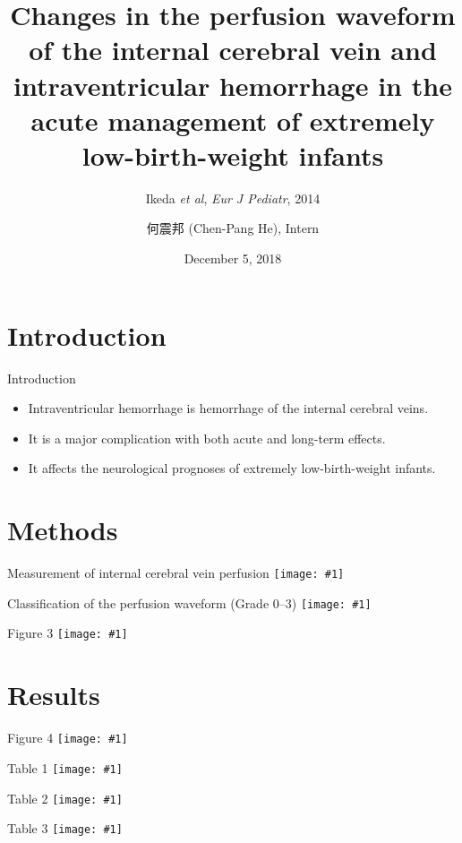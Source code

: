 \documentclass{beamer}
\title[(Ikeda \textit{et al}, 2018)]{
    Changes in the perfusion waveform of the internal cerebral vein and
    intraventricular hemorrhage in the acute management of extremely
    low-birth-weight infants
}
\subtitle{Ikeda \textit{et al}, \textit{Eur J Pediatr}, 2014}
\author[Chen-Pang He]{何震邦 (Chen-Pang He), Intern}
\date{December 5, 2018}
\institute[CGH]{Cathay General Hospital}
\newcommand*{\solo}[1]{\centering\texttt{[image: \#1]}}
\begin{document}
\maketitle

\section{Introduction}
\begin{frame}{Introduction}
    \begin{itemize}
        \item Intraventricular hemorrhage is hemorrhage of the internal cerebral veins.
        \item It is a major complication with both acute and long-term effects.
        \item It affects the neurological prognoses of extremely low-birth-weight infants.
    \end{itemize}
\end{frame}

\section{Methods}
\begin{frame}{Measurement of internal cerebral vein perfusion}
    \solo{F1.png}
\end{frame}

\begin{frame}{Classification of the perfusion waveform (Grade 0--3)}
    \solo{F2.png}
\end{frame}

\begin{frame}{Figure 3}
    \solo{F3.png}
\end{frame}

\section{Results}
\begin{frame}{Figure 4}
    \solo{F4.png}
\end{frame}

\begin{frame}{Table 1}
    \solo{T1.eps}
\end{frame}

\begin{frame}{Table 2}
    \solo{T2.eps}
\end{frame}

\begin{frame}{Table 3}
    \solo{T3.eps}
\end{frame}
\end{document}

